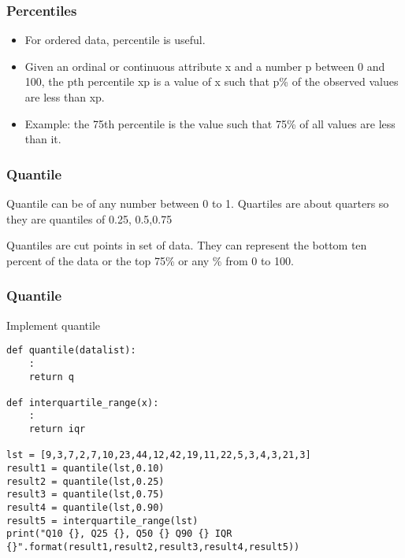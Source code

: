 





\begin{frame}[fragile]\frametitle{Percentiles}	
\begin{itemize}
\item For ordered data, percentile is useful.
\item Given an ordinal or continuous attribute x and a number p between 0 and 100, the pth percentile xp is a value of x such that p\% of the observed values are less than xp.
\item Example: the 75th percentile is the value such that 75\% of all values are less than it.
\end{itemize}

\end{frame}


\begin{frame}[fragile]\frametitle{Quantile}	
Quantile can be of any number between 0 to 1. Quartiles are about quarters so they are quantiles of 0.25, 0.5,0.75

Quantiles are cut points in set of data. They can represent the bottom
ten percent of the data or the top 75\% or any \% from 0 to 100.
\end{frame}


\begin{frame}[fragile]\frametitle{Quantile}
Implement quantile
\begin{lstlisting}
def quantile(datalist):
	:
	return q

def interquartile_range(x):
	:
	return iqr
	
lst = [9,3,7,2,7,10,23,44,12,42,19,11,22,5,3,4,3,21,3]
result1 = quantile(lst,0.10)
result2 = quantile(lst,0.25)
result3 = quantile(lst,0.75)
result4 = quantile(lst,0.90)
result5 = interquartile_range(lst)
print("Q10 {}, Q25 {}, Q50 {} Q90 {} IQR {}".format(result1,result2,result3,result4,result5))
\end{lstlisting}
\end{frame}


